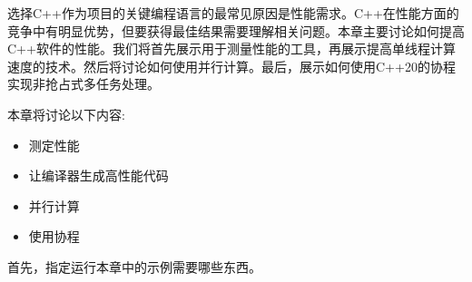 
选择C++作为项目的关键编程语言的最常见原因是性能需求。C++在性能方面的竞争中有明显优势，但要获得最佳结果需要理解相关问题。本章主要讨论如何提高C++软件的性能。我们将首先展示用于测量性能的工具，再展示提高单线程计算速度的技术。然后将讨论如何使用并行计算。最后，展示如何使用C++20的协程实现非抢占式多任务处理。

本章将讨论以下内容:

\begin{itemize}
\item 
测定性能

\item 
让编译器生成高性能代码

\item 
并行计算

\item 
使用协程
\end{itemize}

首先，指定运行本章中的示例需要哪些东西。


